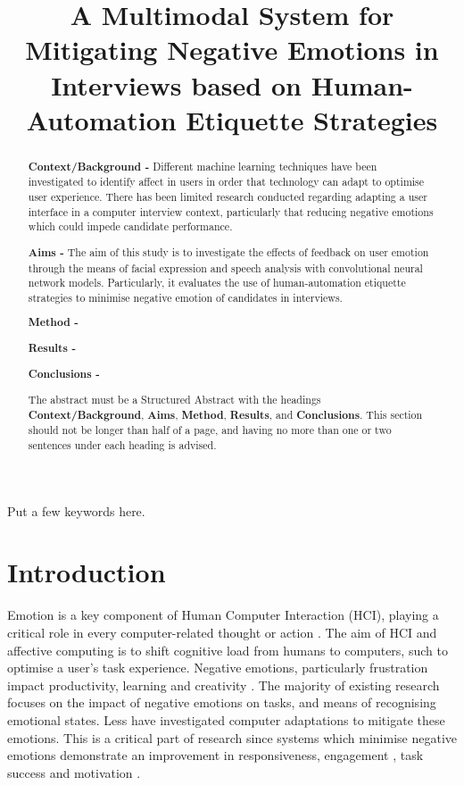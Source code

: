 \documentclass[12pt,a4paper]{article}
\title{A Multimodal System for Mitigating Negative Emotions in Interviews based on Human-Automation Etiquette Strategies}
\author{} %
\date{}
\begin{document}
\maketitle

\begin{abstract}
	
{\bf Context/Background -} Different machine learning techniques have been investigated to identify affect in users in order that technology can adapt to optimise user experience. There has been limited research conducted regarding adapting a user interface in a computer interview context, particularly that reducing negative emotions which could impede candidate performance.

{\bf Aims -} The aim of this study is to investigate the effects of feedback on user emotion through the means of facial expression and speech analysis with convolutional neural network models. Particularly, it evaluates the use of human-automation etiquette strategies to minimise negative emotion of candidates in interviews.

{\bf Method -}

{\bf Results -}

{\bf Conclusions -}


The abstract must be a Structured Abstract with the headings {\bf Context/Background}, {\bf Aims}, {\bf Method}, {\bf Results}, and {\bf Conclusions}.  This section should not be longer than half of a page, and having no more than one or two sentences under each heading is advised.
\end{abstract}

\begin{keywords}
Put a few keywords here.
\end{keywords}

\section{Introduction}
Emotion is a key component of Human Computer Interaction (HCI), playing a critical role in every computer-related thought or action \cite{picard1997does}. The aim of HCI and affective computing is to shift cognitive load from humans to computers, such to optimise a user's task experience.  Negative emotions, particularly frustration impact productivity, learning and creativity \cite{amsel1992frustration}. The majority of existing research focuses on the impact of negative emotions on tasks, and means of recognising emotional states. Less have investigated computer adaptations to mitigate these emotions. This is a critical part of research since systems which minimise negative emotions demonstrate an improvement in responsiveness, engagement \cite{huber2016recognizing}, task success \cite{wang2008politeness} and motivation \cite{aist2002experimentally}. 
\end{document}
